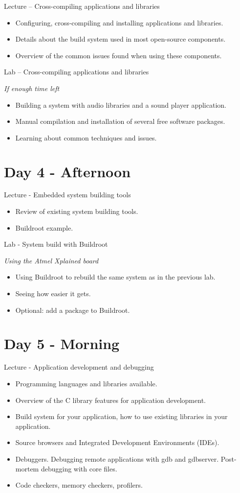 \documentclass[a4paper,12pt,obeyspaces,spaces,hyphens]{article}
\begin{document}
\feagendatwocolumn
{Lecture – Cross-compiling applications and libraries}
{
  \begin{itemize}
  \item Configuring, cross-compiling and installing applications and libraries.
  \item Details about the build system used in most open-source components.
  \item Overview of the common issues found when using these components.
  \end{itemize}
}
{Lab – Cross-compiling applications and libraries}
{
  {\em If enough time left}
  \begin{itemize}
  \item Building a system with audio libraries and a sound player application.
  \item Manual compilation and installation of several free software packages.
  \item Learning about common techniques and issues.
  \end{itemize}
}

\section{Day 4 - Afternoon}

\feagendatwocolumn
{Lecture - Embedded system building tools}
{
  \begin{itemize}
  \item Review of existing system building tools.
  \item Buildroot example.
  \end{itemize}
}
{Lab - System build with Buildroot}
{
  {\em Using the Atmel Xplained board}
  \begin{itemize}
  \item Using Buildroot to rebuild the same system as in the previous lab.
  \item Seeing how easier it gets.
  \item Optional: add a package to Buildroot.
  \end{itemize}
}

\section{Day 5 - Morning}

\feagendaonecolumn
{Lecture - Application development and debugging}
{
  \begin{itemize}
  \item Programming languages and libraries available.
  \item Overview of the C library features for application development.
  \item Build system for your application,
        how to use existing libraries in your application.
  \item Source browsers and Integrated Development Environments (IDEs).
  \item Debuggers. Debugging remote applications with gdb and gdbserver.
        Post-mortem debugging with core files.
  \item Code checkers, memory checkers, profilers.
  \end{itemize}
}
\end{document}
